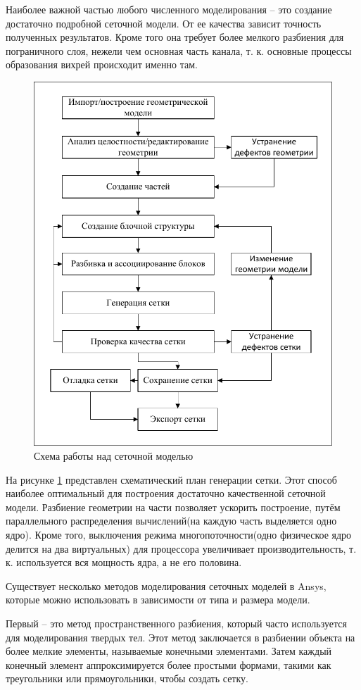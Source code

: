 	Наиболее важной частью любого численного моделирования -- это создание достаточно подробной сеточной модели. От ее качества зависит точность полученных результатов. Кроме того она требует более мелкого разбиения для пограничного слоя, нежели чем основная часть канала, т. к. основные процессы образования вихрей происходит именно там.
	
	\begin{figure}[H]
		\centering
		\includegraphics[width=0.7\linewidth]{../Assets/СхемаСозданияСеткиRU}
		\caption{Схема работы над сеточной моделью}
		\label{fig:meshScheme}
	\end{figure}
	
	На рисунке \ref{fig:meshScheme} представлен схематический план генерации сетки. Этот способ наиболее оптимальный для построения достаточно качественной сеточной модели. Разбиение геометрии на части позволяет ускорить построение, путём параллельного распределения вычислений(на каждую часть выделяется одно ядро). Кроме того, выключения режима многопоточности(одно физическое ядро делится на два виртуальных) для процессора увеличивает производительность, т. к. используется вся мощность ядра, а не его половина.
	
	Существует несколько методов моделирования сеточных моделей в Ansys, которые можно использовать в зависимости от типа и размера модели.
	
	Первый -- это метод пространственного разбиения, который часто используется для моделирования твердых тел. Этот метод заключается в разбиении объекта на более мелкие элементы, называемые конечными элементами. Затем каждый конечный элемент аппроксимируется более простыми формами, такими как треугольники или прямоугольники, чтобы создать сетку.
	
